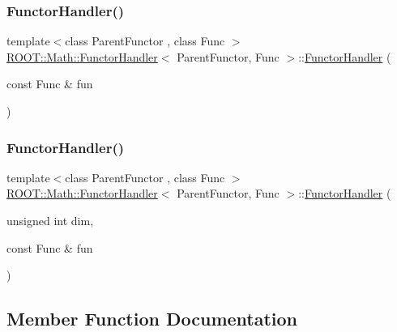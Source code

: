 \subsubsection{\texorpdfstring{FunctorHandler()}{FunctorHandler()}\hspace{0.1cm}{\footnotesize\ttfamily [5/6]}}
{\footnotesize\ttfamily template$<$class Parent\+Functor , class Func $>$ \\
\mbox{\hyperlink{classROOT_1_1Math_1_1FunctorHandler}{R\+O\+O\+T\+::\+Math\+::\+Functor\+Handler}}$<$ Parent\+Functor, Func $>$\+::\mbox{\hyperlink{classROOT_1_1Math_1_1FunctorHandler}{Functor\+Handler}} (\begin{DoxyParamCaption}\item[{const Func \&}]{fun }\end{DoxyParamCaption})\hspace{0.3cm}{\ttfamily [inline]}}

\mbox{\label{classROOT_1_1Math_1_1FunctorHandler_a48929822606300cdd1da079313a981b4}} 
\subsubsection{\texorpdfstring{FunctorHandler()}{FunctorHandler()}\hspace{0.1cm}{\footnotesize\ttfamily [6/6]}}
{\footnotesize\ttfamily template$<$class Parent\+Functor , class Func $>$ \\
\mbox{\hyperlink{classROOT_1_1Math_1_1FunctorHandler}{R\+O\+O\+T\+::\+Math\+::\+Functor\+Handler}}$<$ Parent\+Functor, Func $>$\+::\mbox{\hyperlink{classROOT_1_1Math_1_1FunctorHandler}{Functor\+Handler}} (\begin{DoxyParamCaption}\item[{unsigned int}]{dim,  }\item[{const Func \&}]{fun }\end{DoxyParamCaption})\hspace{0.3cm}{\ttfamily [inline]}}



\subsection{Member Function Documentation}
\mbox{\label{classROOT_1_1Math_1_1FunctorHandler_ad20fb7defe76e6abc244eff203aabbc6}} 
